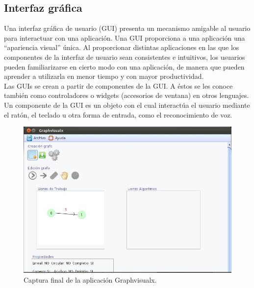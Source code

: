 \documentclass[a4paper,12pt]{article}
\begin{document}
\subsection{Interfaz gráfica}

Una interfaz gráfica de usuario (GUI) presenta un mecanismo amigable al usuario para interactuar con una aplicación. Una GUI proporciona a una aplicación una ``apariencia visual'' única. Al proporcionar distintas aplicaciones en las que los componentes de la interfaz de usuario sean consistentes e intuitivos, los usuarios pueden familiarizarse en cierto modo con una aplicación, de manera que pueden aprender a utilizarla en menor tiempo y con mayor productividad.\\

Las GUIs se crean a partir de componentes de la GUI. A éstos se les conoce también como controladores o widgets (accesorios de ventana) en otros lenguajes. Un componente de la GUI es un objeto con el cual interactúa el usuario mediante el ratón, el teclado u otra forma de entrada, como el reconocimiento de voz.\\

\begin{figure}[H]
\begin{center}
\includegraphics[width=14cm]{./imagenes_documentacion/Graphvisualx_31_1_2012/captura_4.jpeg}
\caption{Captura final de la aplicación Graphvisualx.}
\end{center}
\end{figure} 

\clearpage
\nocite{*}


\pagestyle{empty}
\end{document}

